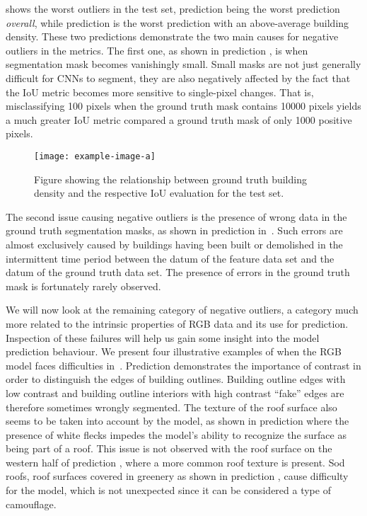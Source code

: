  shows the worst outliers in the test set, prediction  being the worst prediction \emph{overall}, while prediction  is the worst prediction with an above-average building density. %
These two predictions demonstrate the two main causes for negative outliers in the metrics.
The first one, as shown in prediction , is when segmentation mask becomes vanishingly small.
Small masks are not just generally difficult for CNNs to segment, they are also negatively affected by the fact that the IoU metric becomes more sensitive to single-pixel changes.
That is, misclassifying 100 pixels when the ground truth mask contains \num{10000} pixels yields a much greater IoU metric compared a ground truth mask of only \num{1000} positive pixels.

\begin{figure}[H]
  \texttt{[image: example-image-a]}
  \caption{%
    Figure showing the relationship between ground truth building density and the respective IoU evaluation for the test set.
  }%
  \label{fig:rgb-density-relationship}
\end{figure}

The second issue causing negative outliers is the presence of wrong data in the ground truth segmentation masks, as shown in prediction  in~.
Such errors are almost exclusively caused by buildings having been built or demolished in the intermittent time period between the datum of the feature data set and the datum of the ground truth data set.
The presence of errors in the ground truth mask is fortunately rarely observed.

We will now look at the remaining category of negative outliers, a category much more related to the intrinsic properties of RGB data and its use for prediction.
Inspection of these failures will help us gain some insight into the model prediction behaviour.
We present four illustrative examples of when the RGB model faces difficulties in~.
Prediction  demonstrates the importance of contrast in order to distinguish the edges of building outlines.
Building outline edges with low contrast and building outline interiors with high contrast \enquote{fake} edges are therefore sometimes wrongly segmented.
The texture of the roof surface also seems to be taken into account by the model, as shown in prediction  where the presence of white flecks impedes the model's ability to recognize the surface as being part of a roof.
This issue is not observed with the roof surface on the western half of prediction , where a more common roof texture is present.
Sod roofs, roof surfaces covered in greenery as shown in prediction , cause difficulty for the model, which is not unexpected since it can be considered a type of camouflage.

